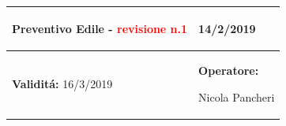 \documentclass[a4paper]{article}
\begin{document}
                          \begin{center}
                          \begin{tabular}{|L{89mm} R{60mm}| }
                          \hline
                          \vspace{2.5mm}
                          \begin{spacing}{0}
                        \textbf{Preventivo Edile - } \textcolor{red}{revisione n.1}
                          \end{spacing}&
                          \vspace{2.5mm}
                          \begin{spacing}{0}

                        14/2/2019

                          \end{spacing}\\
                          \hline
                          \vspace{2.5mm}
                          \begin{spacing}{0}
                          
                        
                                \textbf{Validit\'a:}
                           16/3/2019
                          \end{spacing} &
                          \vspace{2.5mm}
                          \begin{spacing}{0}
                            \textbf{Operatore:}

                       Nicola Pancheri
                          \end{spacing} \\
                          \hline
                          \end{tabular}
                          \end{center}
                       
\end{document}
